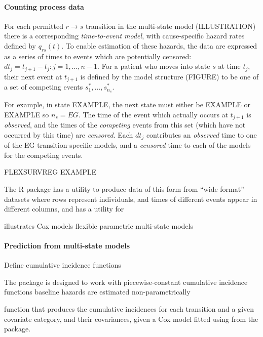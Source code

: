 \documentclass[nojss,nofooter]{jss}
\begin{document}
\paragraph{Counting process data}
For each permitted $r \rightarrow s$ transition in the multi-state
model (ILLUSTRATION) there is a corresponding \emph{time-to-event
  model}, with cause-specific hazard rates defined by $q_{rs}(t)$. To
enable estimation of these hazards, the data are expressed as a series
of times to events which are potentially censored: $dt_{j} = t_{j+1} -
t_{j}: j = 1,\ldots,n-1$. For a patient who moves into state $s$ at
time $t_{j}$, their next event at $t_{j+1}$ is defined by the model
structure (FIGURE) to be one of a set of
competing events $s^*_1,\ldots,s^*_{n_s}$.

For example, in state EXAMPLE, the next state must either be EXAMPLE
or EXAMPLE so $n_s=EG$.  The time of the event which actually occurs
at $t_{j+1}$ is \emph{observed}, and the times of the \emph{competing}
events from this set (which have not occurred by this time) are
\emph{censored}.  Each $dt_{j}$ contributes an \emph{observed} time to
one of the EG transition-specific models, and a \emph{censored} time
to each of the models for the competing events.

FLEXSURVREG EXAMPLE

The  R package \citep{mstate:cmpb,mstate:jss} has a
utility  to produce data of this form from
``wide-format'' datasets where rows represent individuals, and times
of different events appear in different columns, and  has
a utility  for 

illustrates Cox models
flexible parametric multi-state models 

\paragraph{Prediction from multi-state models}

Define cumulative incidence functions

The  package is designed to work with 
piecewise-constant cumulative incidence functions
baseline hazards are estimated non-parametrically 
\citep{mstate:cmpb,mstate:jss} 

function  that produces the cumulative incidences for each transition and a given covariate category, and their covariances, given a Cox model fitted using  from the  package. 
\end{document}
